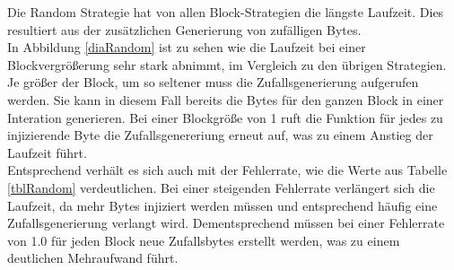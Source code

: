 Die Random Strategie hat von allen Block-Strategien die l\"angste Laufzeit. Dies resultiert aus der zus\"atzlichen Generierung von zuf\"alligen Bytes.\\
In Abbildung \ref{diaRandom} ist zu sehen wie die Laufzeit bei einer Blockvergr\"o\ss erung sehr stark abnimmt, im Vergleich zu den \"ubrigen Strategien. Je gr\"o\ss er der Block, um so seltener muss die Zufallsgenerierung aufgerufen werden. Sie kann in diesem Fall bereits die Bytes für den ganzen Block in einer Interation generieren. Bei einer Blockgr\"o\ss e von 1 ruft die Funktion f\"ur jedes zu injizierende Byte die Zufallsgenereriung erneut auf, was zu einem Anstieg der Laufzeit f\"uhrt. \\
Entsprechend verh\"alt es sich auch mit der Fehlerrate, wie die Werte aus Tabelle \ref{tblRandom} verdeutlichen. Bei einer steigenden Fehlerrate verl\"angert sich die Laufzeit, da mehr Bytes injiziert werden m\"ussen und entsprechend häufig eine Zufallsgenerierung verlangt wird. Dementsprechend m\"ussen bei einer Fehlerrate von 1.0 f\"ur jeden Block neue Zufallsbytes erstellt werden, was zu einem deutlichen Mehraufwand f\"uhrt. \\ 

